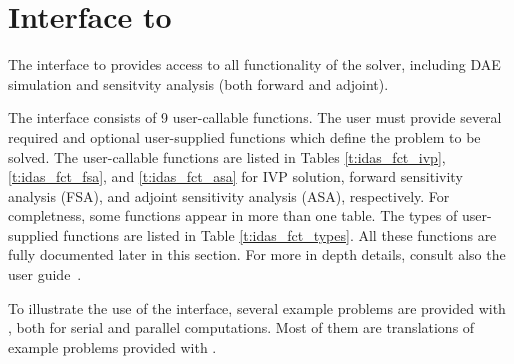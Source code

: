 \newpage
\section{{\matlab} Interface to {\idas}}

The {\matlab} interface to {\idas} provides access to all functionality of the 
{\idas} solver, including DAE simulation and sensitvity analysis (both forward 
and adjoint).

The interface consists of 9 user-callable functions. The user must provide
several required and optional user-supplied functions which define the problem to be solved.
The user-callable functions are listed in Tables \ref{t:idas_fct_ivp}, \ref{t:idas_fct_fsa},
and \ref{t:idas_fct_asa} for IVP solution, forward sensitivity analysis (FSA), and  adjoint 
sensitivity analysis (ASA), respectively.
For completness, some functions appear in more than one table. 
The types of user-supplied functions are listed in Table \ref{t:idas_fct_types}.
%
All these functions are fully documented later in this section.
For more in depth details, consult also the {\idas} user guide~\cite{idas_ug}.

To illustrate the use of the {\idas} {\matlab} interface, several example problems are provided
with {\sundialsTB}, both for serial and parallel computations. Most of them are {\matlab} translations of example
problems provided with {\idas}.




